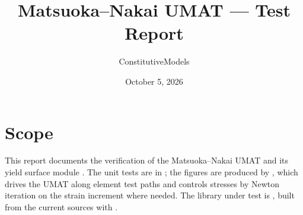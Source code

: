 \documentclass[11pt,a4paper]{article}
\title{Matsuoka--Nakai UMAT --- Test Report}
\author{ConstitutiveModels}
\date{October 5, 2026}
\begin{document}
\maketitle

\section{Scope}

This report documents the verification of the Matsuoka--Nakai UMAT
 and its yield surface module
. The unit tests are in
; the figures are produced by
, which drives the UMAT along element test paths and
controls stresses by Newton iteration on the strain increment where needed. The library under test
is , built from the current sources with
.
\end{document}
